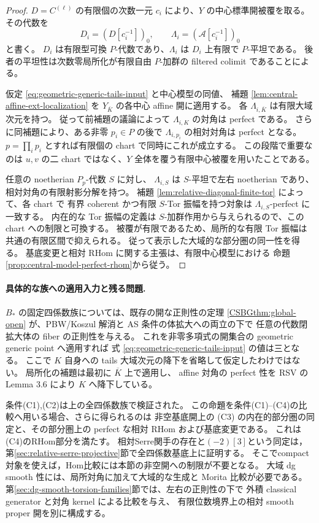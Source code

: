 \begin{proof}
$D=C^{(\ell)}$ の有限個の次数一元 $c_i$ により、$Y$ の中心標準開被覆を取る。
その代数を
\[
 D_i=(D[c_i^{-1}])_0,\qquad
 \Lambda_i=(\mathcal A[c_i^{-1}])_0
\]
と書く。
$D_i$ は有限型可換 $P$-代数であり、$\Lambda_i$ は $D_i$ 上有限で $P$-平坦である。
後者の平坦性は次数零局所化が有限自由 $P$-加群の filtered colimit であることによる。

仮定 \eqref{eq:geometric-generic-tails-input} と中心模型の同値、
補題 \ref{lem:central-affine-ext-localization} を
$Y_{\overline K}$ の各中心 affine 開に適用する。
各 $\Lambda_{i,\overline K}$ は有限大域次元を持つ。
従って前補題の議論によって $\Lambda_{i,K}$ の対角は perfect である。
さらに同補題により、ある非零 $p_i\in P$ の後で $\Lambda_{i,p_i}$ の相対対角は perfect となる。
$p=\prod_i p_i$ とすれば有限個の chart で同時にこれが成立する。
この段階で重要なのは $u,v$ の二 chart ではなく、$Y$ 全体を覆う有限中心被覆を用いたことである。

任意の noetherian $P_p$-代数 $S$ に対し、
$\Lambda_{i,S}$ は $S$-平坦で左右 noetherian であり、相対対角の有限射影分解を持つ。
補題 \ref{lem:relative-diagonal-finite-tor} によって、各 chart で
有界 coherent かつ有限 $S$-Tor 振幅を持つ対象は $\Lambda_{i,S}$-perfect に一致する。
内在的な Tor 振幅の定義は $S$-加群作用から与えられるので、この chart への制限と可換する。
被覆が有限であるため、局所的な有限 Tor 振幅は共通の有限区間で抑えられる。
従って表示した大域的な部分圏の同一性を得る。
基底変更と相対 RHom に関する主張は、有限中心模型における
命題\ref{prop:central-model-perfect-rhom}から従う。
\end{proof}

\paragraph{具体的な族への適用入力と残る問題.}
$B_*$ の固定四係数族については、既存の開な正則性の定理
\ref{CSBGthm:global-open} が、PBW/Koszul 解消と AS 条件の体拡大への両立の下で
任意の代数閉拡大体の fiber の正則性を与える。
これを非零多項式の開集合の geometric generic point へ適用すれば
式 \eqref{eq:geometric-generic-tails-input} の値は三となる。
ここで $K$ 自身への tails 大域次元の降下を省略して仮定したわけではない。
局所化の補題は最初に $\overline K$ 上で適用し、
affine 対角の perfect 性を RSV の Lemma 3.6 により $K$ へ降下している。

条件\textup{(C1),(C2)}は上の全四係数族で検証された。
この命題を条件\textup{(C1)--(C4)}の比較へ用いる場合、さらに得られるのは
非空基底開上の (C3) の内在的部分圏の同定と、その部分圏上の
perfect な相対 RHom および基底変更である。
これは(C4)のRHom部分を満たす。
相対Serre関手の存在と$(-2)[3]$という同定は，
第\ref{sec:relative-serre-projective}節で全四係数基底上に証明する。
そこでcompact対象を使えば，Hom比較には本節の非空開への制限が不要となる。
大域 dg smooth 性には、局所対角に加えて大域的な生成と Morita 比較が必要である。
第\ref{sec:dg-smooth-torsion-families}節では、左右の正則性の下で
外積 classical generator と対角 kernel による比較を与え、
有限位数境界上の相対 smooth proper 開を別に構成する。

